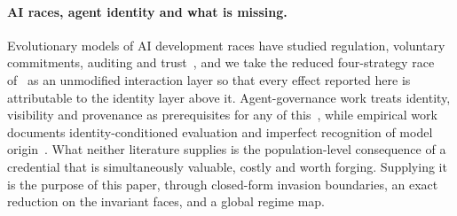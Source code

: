 \paragraph{AI races, agent identity and what is missing.}
Evolutionary models of AI development races have studied regulation, voluntary
commitments, auditing and
trust~\citep{han2020regulate,han2022voluntary,bova2024vigilant}, and we take the
reduced four-strategy race of~\citet{domingos2026falling} as an unmodified
interaction layer so that every effect reported here is attributable to the
identity layer above it. Agent-governance work treats identity, visibility and
provenance as prerequisites for any of
this~\citep{chan2024visibility,chan2025infrastructure,otsuka2026aiidentity,kolt2025governing},
while empirical work documents identity-conditioned evaluation and imperfect
recognition of model
origin~\citep{panickssery2024llm,sun2025idiosyncrasies,wang2026outgroup}. What
neither literature supplies is the population-level consequence of a credential
that is simultaneously valuable, costly and worth forging. Supplying it is the
purpose of this paper, through closed-form invasion boundaries, an exact
reduction on the invariant faces, and a global regime map.

